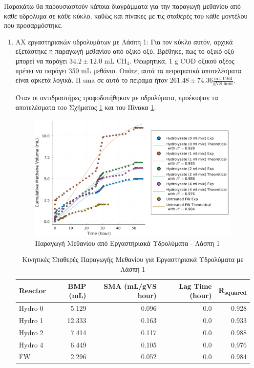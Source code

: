 \documentclass[11pt]{report}
\begin{document}
Παρακάτω θα παρουσιαστούν κάποια διαγράμματα για την παραγωγή μεθανίου από κάθε υδρόλυμα σε κάθε κύκλο, καθώς και πίνακες με τις σταθερές του κάθε μοντέλου που προσαρμόστηκε.

\begin{enumerate}
\item ΑΧ εργαστηριακών υδρολυμάτων με Λάσπη 1:
\label{sec:org58f5321}
Για τον κύκλο αυτόν, αρχικά εξετάστηκε η παραγωγή μεθανίου από οξικό οξύ. Βρέθηκε, πως το οξικό οξύ μπορεί να παράγει \(34.2 \pm 12.0 \text{ mL CH$_4$}\). Θεωρητικά, 1 g COD οξικού οξέος πρέπει να παράγει 350 mL μεθάνιο. Οπότε, αυτά τα πειραματικά αποτελέσματα είναι αρκετά λογικά. Η \acrshort{sma} σε αυτό το πείραμα ήταν \(261.48 \pm 74.36 \frac{\text{mL CH4}}{\text{gVS hour}}\).

Όταν οι αντιδραστήρες τροφοδοτήθηκαν με υδρολύματα, προέκυψαν τα αποτελέσματα του Σχήματος \ref{fig:org5415ebd} και του Πίνακα \ref{tab:orgba3d3b2}.

\begin{figure}[htbp]
\centering
\includegraphics[width=.9\linewidth]{../plots/BMPs/methane_s1_r1_comp.png}
\caption{\label{fig:org5415ebd}Παραγωγή Μεθανίου από Εργαστηριακά Υδρολύματα - Λάσπη 1}
\end{figure}

\begin{table}[htbp]
\caption{\label{tab:orgba3d3b2}Κινητικές Σταθερές Παραγωγής Μεθανίου για Εργαστηριακά Υδρολύματα με Λάσπη 1}
\centering
\begin{tabular}{lrrrr}
Reactor & BMP (mL) & SMA (mL/gVS hour) & Lag Time (hour) & R\textsubscript{squared}\\[0pt]
\hline
Hydro 0 & 5.129 & 0.096 & 0.0 & 0.928\\[0pt]
Hydro 1 & 12.333 & 0.163 & 0.0 & 0.933\\[0pt]
Hydro 2 & 7.414 & 0.117 & 0.0 & 0.988\\[0pt]
Hydro 4 & 6.449 & 0.105 & 0.0 & 0.976\\[0pt]
FW & 2.296 & 0.052 & 0.0 & 0.984\\[0pt]
\end{tabular}
\end{table}


\end{enumerate}
\end{document}
